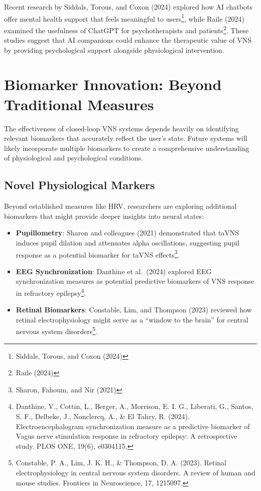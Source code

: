 \documentclass[
  Letterpaper,
]{scrbook}
\providecommand{\tightlist}{%
  \setlength{\itemsep}{0pt}\setlength{\parskip}{0pt}}\usepackage{longtable,booktabs,array}
\begin{document}
Recent research by Siddals, Torous, and Coxon (2024) explored how AI
chatbots offer mental health support that feels meaningful to
users\footnote{Siddals, Torous, and Coxon (2024)}, while Raile (2024)
examined the usefulness of ChatGPT for psychotherapists and
patients\footnote{Raile (2024)}. These studies suggest that AI
companions could enhance the therapeutic value of VNS by providing
psychological support alongside physiological intervention.

\section{Biomarker Innovation: Beyond Traditional
Measures}\label{biomarker-innovation-beyond-traditional-measures}

The effectiveness of closed-loop VNS systems depends heavily on
identifying relevant biomarkers that accurately reflect the user's
state. Future systems will likely incorporate multiple biomarkers to
create a comprehensive understanding of physiological and psychological
conditions.

\subsection{Novel Physiological
Markers}\label{novel-physiological-markers}

Beyond established measures like HRV, researchers are exploring
additional biomarkers that might provide deeper insights into neural
states:

\begin{itemize}
\tightlist
\item
  \textbf{Pupillometry}: Sharon and colleagues (2021) demonstrated that
  taVNS induces pupil dilation and attenuates alpha oscillations,
  suggesting pupil response as a potential biomarker for taVNS
  effects\footnote{Sharon, Fahoum, and Nir (2021)}.
\item
  \textbf{EEG Synchronization}: Danthine et al.~(2024) explored EEG
  synchronization measures as potential predictive biomarkers of VNS
  response in refractory epilepsy\footnote{Danthine, V., Cottin, L.,
    Berger, A., Morrison, E. I. G., Liberati, G., Santos, S. F.,
    Delbeke, J., Nonclercq, A., \& El Tahry, R. (2024).
    Electroencephalogram synchronization measure as a predictive
    biomarker of Vagus nerve stimulation response in refractory
    epilepsy: A retrospective study. PLOS ONE, 19(6), e0304115.}.
\item
  \textbf{Retinal Biomarkers}: Constable, Lim, and Thompson (2023)
  reviewed how retinal electrophysiology might serve as a ``window to
  the brain'' for central nervous system disorders\footnote{Constable,
    P. A., Lim, J. K. H., \& Thompson, D. A. (2023). Retinal
    electrophysiology in central nervous system disorders. A review of
    human and mouse studies. Frontiers in Neuroscience, 17, 1215097.}.
\end{itemize}
\end{document}
